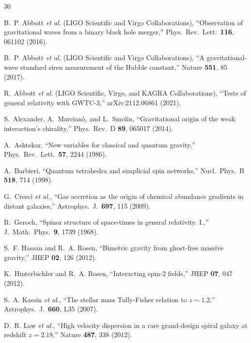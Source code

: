 \documentclass[aps,prd,preprint,superscriptaddress,showpacs,preprintnumbers,amsmath,amssymb,nofootinbib]{revtex4-2}
\begin{document}
\begin{thebibliography}{30}

B.~P. Abbott \textit{et al.} (LIGO Scientific and Virgo Collaborations), ``Observation of gravitational waves from a binary black hole merger,'' Phys.\ Rev.\ Lett.\ \textbf{116}, 061102 (2016).

B.~P. Abbott \textit{et al.} (LIGO Scientific and Virgo Collaborations), ``A gravitational-wave standard siren measurement of the Hubble constant,'' Nature \textbf{551}, 85 (2017).

R.~Abbott \textit{et al.} (LIGO Scientific, Virgo, and KAGRA Collaborations), ``Tests of general relativity with GWTC-3,'' arXiv:2112.06861 (2021).

S.~Alexander, A.~Marcian\`{o}, and L.~Smolin, ``Gravitational origin of the weak interaction's chirality,'' Phys.\ Rev.\ D \textbf{89}, 065017 (2014).

A.~Ashtekar, ``New variables for classical and quantum gravity,'' Phys.\ Rev.\ Lett.\ \textbf{57}, 2244 (1986).

A.~Barbieri, ``Quantum tetrahedra and simplicial spin networks,'' Nucl.\ Phys.\ B \textbf{518}, 714 (1998).

G.~Cresci \textit{et al.}, ``Gas accretion as the origin of chemical abundance gradients in distant galaxies,'' Astrophys.\ J.\ \textbf{697}, 115 (2009).

R.~Geroch, ``Spinor structure of space-times in general relativity. I.,'' J.\ Math.\ Phys.\ \textbf{9}, 1739 (1968).

S.~F. Hassan and R.~A. Rosen, ``Bimetric gravity from ghost-free massive gravity,'' JHEP \textbf{02}, 126 (2012).

K.~Hinterbichler and R.~A. Rosen, ``Interacting spin-2 fields,'' JHEP \textbf{07}, 047 (2012).

S.~A. Kassin \textit{et al.}, ``The stellar mass Tully-Fisher relation to $z \sim 1.2$,'' Astrophys.\ J.\ \textbf{660}, L35 (2007).

D.~R. Law \textit{et al.}, ``High velocity dispersion in a rare grand-design spiral galaxy at redshift $z = 2.18$,'' Nature \textbf{487}, 338 (2012).


\end{thebibliography}
\end{document}
